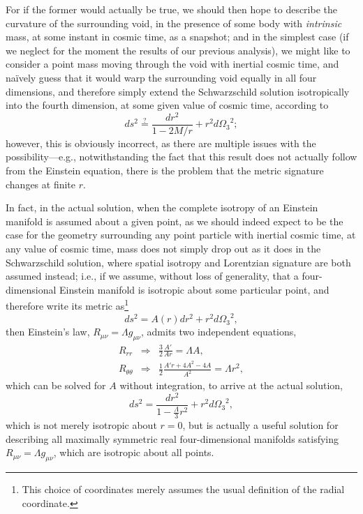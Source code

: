 For if the former would actually be true, we should then hope to describe the curvature of the surrounding void, in the presence of some body with \textit{intrinsic} mass, at some instant in cosmic time, as a snapshot; and in the simplest case (if we neglect for the moment the results of our previous analysis), we might like to consider a point mass moving through the void with inertial cosmic time, and na\"{i}vely guess that it would warp the surrounding void equally in all four dimensions, and therefore simply extend the Schwarzschild solution isotropically into the fourth dimension, at some given value of cosmic time, according to
\begin{equation}
ds^2\stackrel{?}{=}\frac{dr^2}{1-2M/r}+r^2{d\Omega_3}^2;
\end{equation}
however, this is obviously incorrect, as there are multiple issues with the possibility---e.g., notwithstanding the fact that this result does not actually follow from the Einstein equation, there is the problem that the metric signature changes at finite $r$.

In fact, in the actual solution, when the complete isotropy of an Einstein manifold is assumed about a given point, as we should indeed expect to be the case for the geometry surrounding any point particle with inertial cosmic time, at any value of cosmic time, mass does not simply drop out as it does in the Schwarzschild solution, where spatial isotropy and Lorentzian signature are both assumed instead; i.e., if we assume, without loss of generality, that a four-dimensional Einstein manifold is isotropic about some particular point, and therefore write its metric as\footnote{This choice of coordinates merely assumes the usual definition of the radial coordinate.}
\begin{equation}
ds^2=A(r)dr^2+r^2{d\Omega_3}^2,\label{max_symm}
\end{equation}
then Einstein's law, $R_{\mu\nu}={\Lambda}g_{\mu\nu}$, admits two independent equations,
\begin{eqnarray}
R_{rr}&\Rightarrow &\frac{3}{2}\frac{A'}{Ar}={\Lambda}A,\\
R_{\theta\theta}&\Rightarrow &\frac{1}{2}\frac{A'r+4A^2-4A}{A^2}={\Lambda}r^2,
\end{eqnarray}
which can be solved for $A$ without integration, to arrive at the actual solution,
\begin{equation}
ds^2=\frac{dr^2}{1-\frac{\Lambda}{3}r^2}+r^2{d\Omega_3}^2,\label{max_symm_space}
\end{equation}
which is not merely isotropic about $r=0$, but is actually a useful solution for describing all maximally symmetric real four-dimensional manifolds satisfying $R_{\mu\nu}={\Lambda}g_{\mu\nu}$, which are isotropic about all points. 

